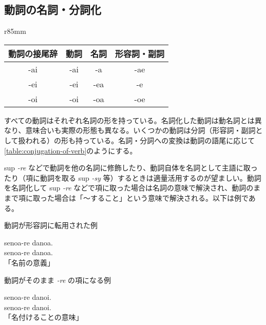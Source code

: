 \subsection{動詞の名詞・分詞化}

\begin{wraptable}[8]{r}{85mm}
    \centering
    \caption{動詞の名詞・分詞化}
    \label{table:conjugation-of-verb}
    \begin{tabular}{cccc}
        \toprule
        動詞の接尾辞 & 動詞 & 名詞 & 形容詞・副詞 \\
        \midrule
        -ai & -ai & -a  & -ae \\
        -ei & -ei & -ea & -e  \\
        -oi & -oi & -oa & -oe \\
        \bottomrule
    \end{tabular}
\end{wraptable}

すべての動詞はそれぞれ名詞の形を持っている。名詞化した動詞は動名詞とは異なり、意味合いも実際の形態も異なる。いくつかの動詞は分詞（形容詞・副詞として扱われる）の形も持っている。名詞・分詞への変換は動詞の語尾に応じて\cref{table:conjugation-of-verb}のようにする。

sup \emph{-re} などで動詞を他の名詞に修飾したり、動詞自体を名詞として主語に取ったり（項に動詞を取る sup \emph{-sy} 等）するときは適量活用するのが望ましい。動詞を名詞化して sup \emph{-re} などで項に取った場合は名詞の意味で解決され、動詞のままで項に取った場合は「～すること」という意味で解決される。以下は例である。

\begin{itembox}[l]{動詞が形容詞に転用された例}
    \begin{pindent}
        \noindent
        senoa-re danoa. \\
        senoa-re danoa. \\
        「名前の意義」
    \end{pindent}
\end{itembox}

\begin{itembox}[l]{動詞がそのまま \emph{-re} の項になる例}
    \begin{pindent}
        senoa-re danoi. \\
        senoa-re danoi. \\
        「名付けることの意味」
        \noindent
    \end{pindent}
\end{itembox}

